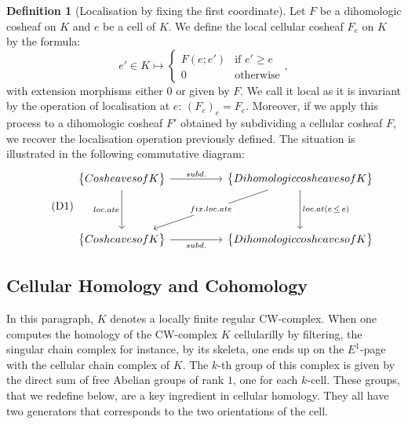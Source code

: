 \documentclass[10pt]{amsart}
\theoremstyle{definition}
\newtheorem{defi}[theo]{Definition}
\numberwithin{equation}{section}
\numberwithin{figure}{section}
\begin{document}
\begin{defi}[Localisation by fixing the first coordinate]
Let $F$ be a dihomologic cosheaf on $K$ and $e$ be a cell of $K$. We define the local cellular cosheaf $F_e$ on $K$ by the formula:
\begin{equation*}
e'\in K \longmapsto \left\{
\begin{array}{cl} F(e;e') & \text{if }e'\geq e \\ 0 & \text{otherwise}
\end{array}\right.,
\end{equation*}
with extension morphisms either $0$ or given by $F$. We call it local as it is invariant by the operation of localisation at $e$: $(F_e)_e=F_e$. Moreover, if we apply this process to a dihomologic cosheaf $F'$ obtained by subdividing a cellular cosheaf $F$, we recover the localisation operation previously defined. The situation is illustrated in the following commutative diagram:
\begin{equation}
\tag{D1}\label{diag:comm_rel_loc}
\begin{tikzcd}
\big\{\textnormal{Cosheaves of }K\big\} \arrow[dd,"\textnormal{loc. at }e" left] \arrow[rr,"\textnormal{subd.}"] & & \big\{\textnormal{Dihomologic cosheaves of }K\big\} \arrow[ddll,"\textnormal{fix. loc. at }e" description] \arrow[dd,"\textnormal{loc. at }(e\,\leq\,e)"] \\%
& \\%
\big\{\textnormal{Cosheaves of }K\big\} \ar[rr,"\textnormal{subd.}" below] & & \big\{\textnormal{Dihomologic cosheaves of }K\big\}
\end{tikzcd}
\end{equation}
\end{defi}

\subsection{Cellular Homology and Cohomology}

In this paragraph, $K$ denotes a locally finite regular CW-complex. When one computes the homology of the CW-complex $K$ cellularilly by filtering, the singular chain complex for instance, by its skeleta, one ends up on the $E^1$-page with the cellular chain complex of $K$. The $k$-th group of this complex is given by the direct sum of free Abelian groups of rank $1$, one for each $k$-cell. These groups, that we redefine below, are a key ingredient in cellular homology. They all have two generators that corresponds to the two orientations of the cell.
\end{document}

